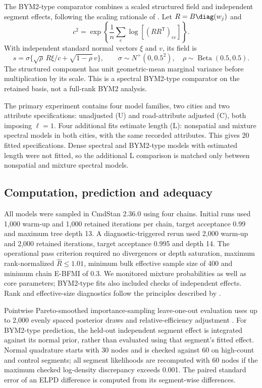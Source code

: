 \documentclass[11pt]{article}
\begin{document}
The BYM2-type comparator combines a scaled structured field and independent segment effects, following the scaling rationale of \citet{riebler2016}. Let $R=B\diag(w_j)$ and
\begin{equation}
 c^2=\exp\left\{\frac{1}{n}\sum_e\log[(RR^{\mathsf T})_{ee}]\right\}.
\end{equation}
With independent standard normal vectors $\xi$ and $v$, its field is
\begin{equation}
 s=\sigma\{\sqrt{\rho}\,R\xi/c+\sqrt{1-\rho}\,v\},\qquad
 \sigma\sim N^+(0,0.5^2),\quad\rho\sim\operatorname{Beta}(0.5,0.5).
\end{equation}
The structured component has unit geometric-mean marginal variance before multiplication by its scale. This is a spectral BYM2-type comparator on the retained basis, not a full-rank BYM2 analysis.

The primary experiment contains four model families, two cities and two attribute specifications: unadjusted (U) and road-attribute adjusted (C), both imposing $\ell=1$. Four additional fits estimate length (L): nonspatial and mixture spectral models in both cities, with the same recorded attributes. This gives 20 fitted specifications. Dense spectral and BYM2-type models with estimated length were not fitted, so the additional L comparison is matched only between nonspatial and mixture spectral models.

\subsection{Computation, prediction and adequacy}
All models were sampled in CmdStan 2.36.0 using four chains. Initial runs used 1,000 warm-up and 1,000 retained iterations per chain, target acceptance 0.99 and maximum tree depth 13. A diagnostic-triggered rerun used 2,000 warm-up and 2,000 retained iterations, target acceptance 0.995 and depth 14. The operational pass criterion required no divergences or depth saturation, maximum rank-normalized $\widehat R\leq1.01$, minimum bulk effective sample size of 400 and minimum chain E-BFMI of 0.3. We monitored mixture probabilities as well as core parameters; BYM2-type fits also included checks of independent effects. Rank and effective-size diagnostics follow the principles described by \citet{vehtari2021}.

Pointwise Pareto-smoothed importance-sampling leave-one-out evaluation uses up to 2,000 evenly spaced posterior draws and relative-efficiency adjustment \citep{vehtari2017}. For BYM2-type prediction, the held-out independent segment effect is integrated against its normal prior, rather than evaluated using that segment's fitted effect. Normal quadrature starts with 30 nodes and is checked against 60 on high-count and control segments; all segment likelihoods are recomputed with 60 nodes if the maximum checked log-density discrepancy exceeds 0.001. The paired standard error of an ELPD difference is computed from its segment-wise differences.
\end{document}
